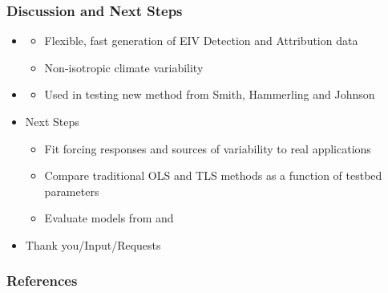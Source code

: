 \documentclass{beamer}
\begin{document}
\begin{frame}
\frametitle{Discussion and Next Steps}
\begin{itemize}
\item {}
\begin{itemize}
\item Flexible, fast generation of EIV Detection and Attribution data
\item Non-isotropic climate variability
\end{itemize}

\item {}
\begin{itemize}
\item Used in testing new method from Smith, Hammerling and Johnson
\end{itemize}

\item \alert{Next Steps}
\begin{itemize}
\item Fit forcing responses and sources of variability to real applications
\item Compare traditional OLS and TLS methods as a function of testbed parameters
\item Evaluate models from \cite{hannart16} and \cite{khs17}
\end{itemize}
\item Thank you/Input/Requests
\end{itemize}

\end{frame}

\begin{frame}
\frametitle{References}



\end{frame}
\end{document}
